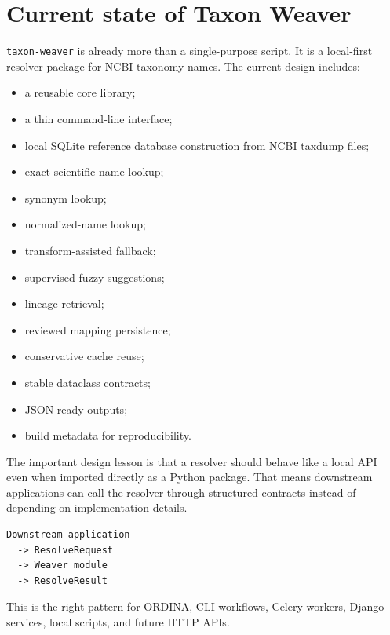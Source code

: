 \documentclass[11pt,a4paper]{article}
\newcommand{\code}[1]{\texttt{#1}}
\begin{document}
\section{Current state of Taxon Weaver}

\code{taxon-weaver} is already more than a single-purpose script. It is a local-first resolver package for NCBI taxonomy names. The current design includes:

\begin{itemize}
  \item a reusable core library;
  \item a thin command-line interface;
  \item local SQLite reference database construction from NCBI taxdump files;
  \item exact scientific-name lookup;
  \item synonym lookup;
  \item normalized-name lookup;
  \item transform-assisted fallback;
  \item supervised fuzzy suggestions;
  \item lineage retrieval;
  \item reviewed mapping persistence;
  \item conservative cache reuse;
  \item stable dataclass contracts;
  \item JSON-ready outputs;
  \item build metadata for reproducibility.
\end{itemize}

The important design lesson is that a resolver should behave like a local API even when imported directly as a Python package. That means downstream applications can call the resolver through structured contracts instead of depending on implementation details.

\begin{Verbatim}[fontsize=\small]
Downstream application
  -> ResolveRequest
  -> Weaver module
  -> ResolveResult
\end{Verbatim}

This is the right pattern for ORDINA, CLI workflows, Celery workers, Django services, local scripts, and future HTTP APIs.

\end{document}
